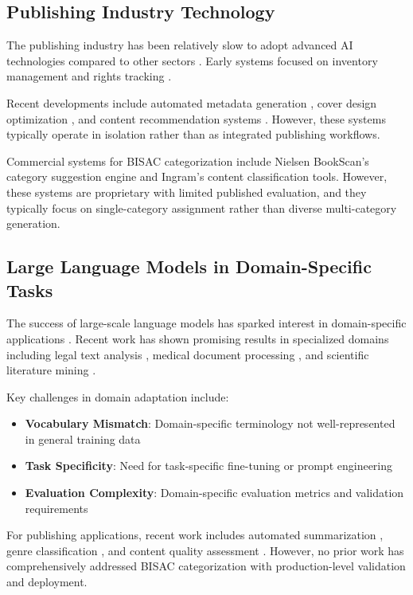 \documentclass{article}
\begin{document}
\subsection{Publishing Industry Technology}

The publishing industry has been relatively slow to adopt advanced AI technologies compared to other sectors \cite{thompson2021digital}. Early systems focused on inventory management and rights tracking \cite{greco2018publishing}.

Recent developments include automated metadata generation \cite{chen2022metadata}, cover design optimization \cite{liu2023visual}, and content recommendation systems \cite{gomez2023recommendation}. However, these systems typically operate in isolation rather than as integrated publishing workflows.

Commercial systems for BISAC categorization include Nielsen BookScan's category suggestion engine and Ingram's content classification tools. However, these systems are proprietary with limited published evaluation, and they typically focus on single-category assignment rather than diverse multi-category generation.

\subsection{Large Language Models in Domain-Specific Tasks}

The success of large-scale language models has sparked interest in domain-specific applications \cite{brown2020gpt3}. Recent work has shown promising results in specialized domains including legal text analysis \cite{chalkidis2022lexglue}, medical document processing \cite{lee2020biobert}, and scientific literature mining \cite{beltagy2019scibert}.

Key challenges in domain adaptation include:
\begin{itemize}
\item \textbf{Vocabulary Mismatch}: Domain-specific terminology not well-represented in general training data
\item \textbf{Task Specificity}: Need for task-specific fine-tuning or prompt engineering
\item \textbf{Evaluation Complexity}: Domain-specific evaluation metrics and validation requirements
\end{itemize}

For publishing applications, recent work includes automated summarization \cite{narayan2018abstractive}, genre classification \cite{kessler1997automatic}, and content quality assessment \cite{vajjala2018automatic}. However, no prior work has comprehensively addressed BISAC categorization with production-level validation and deployment.
\end{document}
